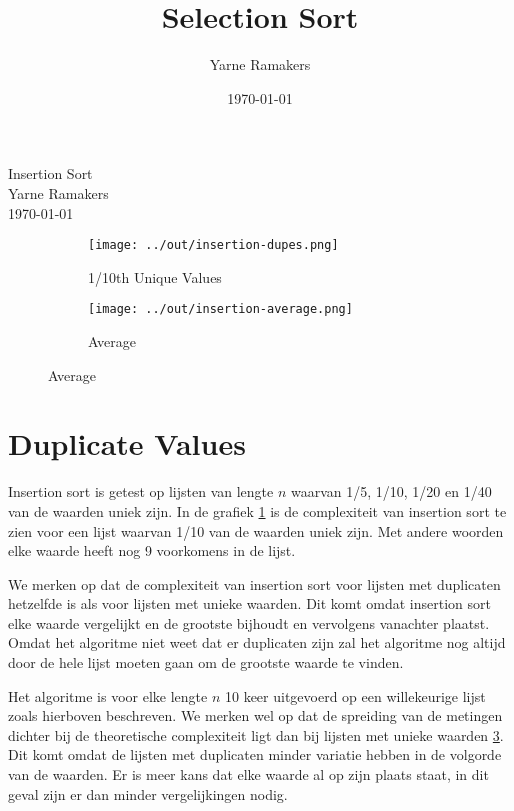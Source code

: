 \documentclass[a4paper]{article}
\title{Selection Sort}
\author{Yarne Ramakers}
\date{\today}
\begin{document}
\begin{center}
  Insertion Sort \\
  Yarne Ramakers \\
  \today \\
\end{center}

\begin{figure}[h]
  \begin{subfigure}[b]{0.5\textwidth}
    \texttt{[image: ../out/insertion-dupes.png]}
    \caption{1/10th Unique Values}
    \label{fig:insertion-dupes}
  \end{subfigure}
  \begin{subfigure}[b]{0.5\textwidth}
    \texttt{[image: ../out/insertion-average.png]}
    \caption{Average}
    \label{fig:insertion-avg}
  \end{subfigure}\hfill
\end{figure}

\section{Duplicate Values}
Insertion sort is getest op lijsten van lengte $n$ waarvan 1/5, 1/10, 1/20 en 1/40 van de waarden uniek zijn. 
In de grafiek \ref{fig:insertion-dupes} is de complexiteit van insertion sort te zien voor een lijst waarvan 1/10 van de waarden uniek zijn.
Met andere woorden elke waarde heeft nog 9 voorkomens in de lijst.
\par 
We merken op dat de complexiteit van insertion sort voor lijsten met duplicaten hetzelfde is als voor lijsten met unieke waarden.
Dit komt omdat insertion sort elke waarde vergelijkt en de grootste bijhoudt en vervolgens vanachter plaatst.
Omdat het algoritme niet weet dat er duplicaten zijn zal het algoritme nog altijd door de hele lijst moeten gaan om de grootste waarde te vinden.
\par
Het algoritme is voor elke lengte $n$ 10 keer uitgevoerd op een willekeurige lijst zoals hierboven beschreven.
We merken wel op dat de spreiding van de metingen dichter bij de theoretische complexiteit ligt dan bij lijsten met unieke waarden \ref{fig:insertion-avg}.
Dit komt omdat de lijsten met duplicaten minder variatie hebben in de volgorde van de waarden.
Er is meer kans dat elke waarde al op zijn plaats staat, in dit geval zijn er dan minder vergelijkingen nodig.
\end{document}
